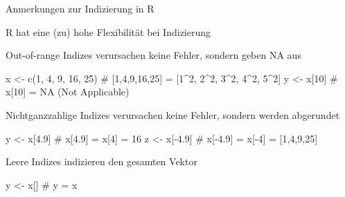 \documentclass[
  8pt,
  ignorenonframetext,
]{beamer}
\newenvironment{Shaded}{\begin{snugshade}}{\end{snugshade}}
\newcommand{\CommentTok}[1]{\textcolor[rgb]{0.37,0.37,0.37}{#1}}
\newcommand{\DecValTok}[1]{\textcolor[rgb]{0.68,0.00,0.00}{#1}}
\newcommand{\FloatTok}[1]{\textcolor[rgb]{0.68,0.00,0.00}{#1}}
\newcommand{\FunctionTok}[1]{\textcolor[rgb]{0.28,0.35,0.67}{#1}}
\newcommand{\NormalTok}[1]{\textcolor[rgb]{0.00,0.23,0.31}{#1}}
\newcommand{\OtherTok}[1]{\textcolor[rgb]{0.00,0.23,0.31}{#1}}
\newcommand{\SpecialCharTok}[1]{\textcolor[rgb]{0.37,0.37,0.37}{#1}}
\begin{document}
\begin{frame}[fragile]{Anmerkungen zur Indizierung in R}
\protect\hypertarget{anmerkungen-zur-indizierung-in-r}{}
\normalsize

R hat eine (zu) hohe Flexibilität bei Indizierung

\small
\vspace{1mm}

Out-of-range Indizes verursachen keine Fehler, sondern geben NA aus
\footnotesize

\begin{Shaded}
\begin{Highlighting}[]
\NormalTok{x }\OtherTok{\textless{}{-}} \FunctionTok{c}\NormalTok{(}\DecValTok{1}\NormalTok{, }\DecValTok{4}\NormalTok{, }\DecValTok{9}\NormalTok{, }\DecValTok{16}\NormalTok{, }\DecValTok{25}\NormalTok{)  }\CommentTok{\# [1,4,9,16,25] = [1\^{}2, 2\^{}2, 3\^{}2, 4\^{}2, 5\^{}2]}
\NormalTok{y }\OtherTok{\textless{}{-}}\NormalTok{ x[}\DecValTok{10}\NormalTok{]               }\CommentTok{\# x[10] = NA (Not Applicable)}
\end{Highlighting}
\end{Shaded}

\vspace{1mm}

Nichtganzzahlige Indizes verursachen keine Fehler, sondern werden
abgerundet \footnotesize

\begin{Shaded}
\begin{Highlighting}[]
\NormalTok{y }\OtherTok{\textless{}{-}}\NormalTok{ x[}\FloatTok{4.9}\NormalTok{]              }\CommentTok{\# x[4.9] = x[4] = 16}
\NormalTok{z }\OtherTok{\textless{}{-}}\NormalTok{ x[}\SpecialCharTok{{-}}\FloatTok{4.9}\NormalTok{]             }\CommentTok{\# x[{-}4.9] = x[{-}4] = [1,4,9,25]}
\end{Highlighting}
\end{Shaded}

\vspace{1mm}

Leere Indizes indizieren den gesamten Vektor \footnotesize

\begin{Shaded}
\begin{Highlighting}[]
\NormalTok{y }\OtherTok{\textless{}{-}}\NormalTok{ x[]                 }\CommentTok{\# y = x}
\end{Highlighting}
\end{Shaded}

\vfill
\end{frame}
\end{document}

